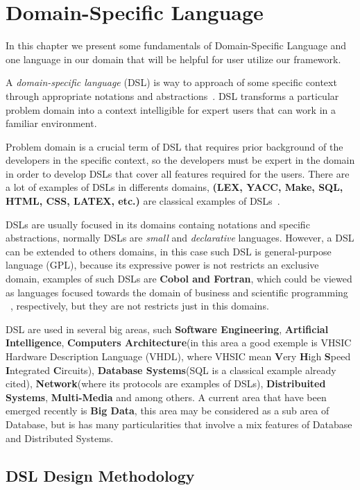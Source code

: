 \chapter{Domain-Specific Language} %
\label{cha:dsl}

In this chapter we present some fundamentals of Domain-Specific Language and one
language in our domain that will be helpful for user utilize our framework.

A \textit{domain-specific language} (DSL) is way to approach of some specific
context through appropriate notations and abstractions~\cite{deursen:2000}. DSL
transforms a particular problem domain into a context intelligible for expert
users that can work in a familiar environment.

Problem domain is a crucial term of DSL that requires prior background of the
developers in the specific context, so the developers must be expert in the domain
in order to develop DSLs that cover all features required for the users. There are
a lot of examples of DSLs in differents domains, \textbf{(LEX, YACC, Make, SQL,
HTML, CSS, LATEX, etc.)} are classical examples of DSLs~\cite{bentley:1986}.

DSLs are usually focused in its domains containg notations and specific abstractions,
normally DSLs are \textit{small} and \textit{declarative} languages. However, a
DSL can be extended to others domains, in this case such DSL is
general-purpose language (GPL), because its expressive power is not restricts
an exclusive domain, examples of such DSLs are \textbf{Cobol and Fortran}, which
could be viewed as languages focused towards the domain of business and scientific
programming  ~\cite{deursen:2000}, respectively, but they are not restricts just
in this domains.

DSL are used in several big areas, such \textbf{Software Engineering}, 
\textbf{Artificial Intelligence}, \textbf{Computers Architecture}(in this area a
good exemple is VHSIC Hardware Description Language (VHDL), where VHSIC mean 
{\bf V}ery {\bf H}igh {\bf S}peed {\bf I}ntegrated {\bf C}ircuits), \textbf{Database
Systems}(SQL is a classical example already cited), \textbf{Network}(where its
protocols are examples of DSLs), \textbf{Distribuited Systems}, \textbf{Multi-Media}
and among others. A current area that have been emerged recently is \textbf{Big Data},
this area may be considered as a sub area of Database, but is has many
particularities that involve a mix features of Database and Distributed Systems.

\section{DSL Design Methodology}

